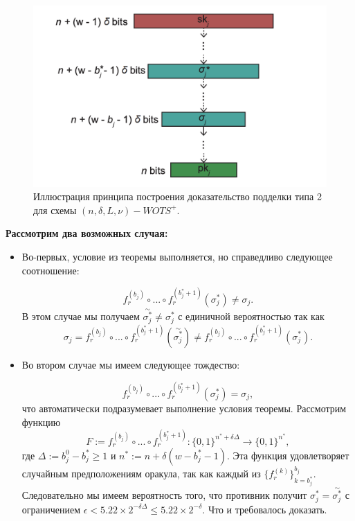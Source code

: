 \documentclass[a4paper, 14pt]{extarticle}
\begin{document}
\begin{figure}[h]
    \centering
    \includegraphics[scale=0.65]{WOTS+_2.png}
    \caption{Иллюстрация принципа построения доказательство подделки типа 2 для схемы $(n, \delta, L, \nu)-WOTS^{+}$. }
    \label{fig:wots2}
\end{figure}

\newpage

\textbf{Рассмотрим два возможных случая:}

\begin{itemize}
    \item Во-первых, условие из теоремы выполняется, но справедливо следующее соотношение:

    \[f^{(b_{j})}_{r} \circ ... \circ f^{(b^{*}_{j}+1)}_{r}(\sigma^{*}_{j}) \neq \sigma_{j}.\]
    В этом случае мы получаем $\stackrel{\sim}{\sigma^{*}_{j}} \neq \sigma^{*}_{j}$ с единичной вероятностью так как
    \[\sigma_{j} = f^{(b_{j})}_{r} \circ ... \circ f^{(b^{*}_{j}+1)}_{r}(\stackrel{\sim}{\sigma^{*}_{j}}) \neq f^{(b_{j})}_{r} \circ ... \circ f^{(b^{*}_{j}+1)}_{r}(\sigma^{*}_{j}).\]

    \item Во втором случае мы имеем следующее тождество:

    \[f^{(b_{j})}_{r} \circ ... \circ f^{(b^{*}_{j}+1)}_{r}(\sigma^{*}_{j}) = \sigma_{j},\]
    что автоматически подразумевает выполнение условия теоремы. Рассмотрим функцию
    \[F := f^{(b_{j})}_{r} \circ ... \circ f^{(b^{*}_{j}+1)}_{r} : \{0, 1\}^{n^{*} + \delta \Delta} \rightarrow \{0,1\}^{n^{*}},\]
    где $\Delta := b^{0}_{j} - b^{*}_{j} \geq 1$ и $n^{*} := n + \delta(w - b^{*}_{j} - 1)$. Эта функция удовлетворяет случайным предположениям оракула, так как каждый из $\{f^{(k)}_{r}\}^{b_{j}}_{k=b^{*}_{j}}$. Следовательно мы имеем вероятность того, что противник получит $\sigma^{*}_{j} = \stackrel{\sim}{\sigma^{*}_{j}}$ с ограничением $\epsilon < 5.22 \times 2^{-\delta \Delta} \leq 5.22 \times 2^{-\delta}$. Что и требовалось доказать.
\end{itemize}
\newpage
\end{document}
